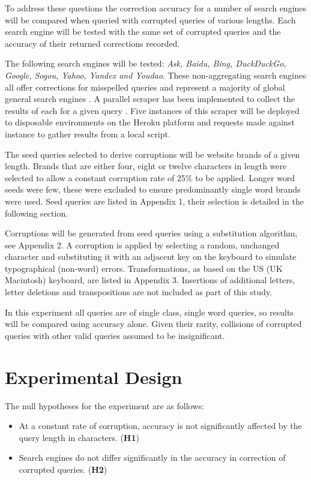 \documentclass{csfourzero}
\begin{document}
To address these questions the correction accuracy for a number of search engines will be compared when queried with corrupted queries of various lengths. Each search engine will be tested with the same set of corrupted queries and the accuracy of their returned corrections recorded.

The following search engines will be tested: \textit{Ask, Baidu, Bing, DuckDuckGo, Google, Sogou, Yahoo, Yandex and Youdao}. These non-aggregating search engines all offer corrections for misspelled queries and represent a majority of global general search engines \cite{searchenginewiki}. A parallel scraper has been implemented to collect the results of each for a given query \cite{scraper}. Five instances of this scraper will be deployed to disposable environments on the Heroku platform and requests made against instance to gather results from a local script.

The seed queries selected to derive corruptions will be website brands of a given length. Brands that are either four, eight or twelve characters in length were selected to allow a constant corruption rate of 25\% to be applied. Longer word seeds were few, these were excluded to ensure predominantly single word brands were used. Seed queries are listed in Appendix 1, their selection is detailed in the following section.

Corruptions will be generated from seed queries using a substitution algorithm, see Appendix 2. A corruption is applied by selecting a random, unchanged character and substituting it with an adjacent key on the keyboard to simulate typographical (non-word) errors. Transformations, as based on the US (UK Macintosh) keyboard, are listed in Appendix 3. Insertions of additional letters, letter deletions and transpositions are not included as part of this study.

In this experiment all queries are of single class, single word queries, so results will be compared using accuracy alone. Given their rarity, collisions of corrupted queries with other valid queries assumed to be insignificant.

\section{Experimental Design}
\label{sec:exp}

The null hypotheses for the experiment are as follows:
\begin{itemize}
  \item{At a constant rate of corruption, accuracy is not significantly affected by the query length in characters. (\textbf{H1})}
  \item{Search engines do not differ significantly in the accuracy in correction of corrupted queries. (\textbf{H2})}
\end{itemize}
\end{document}
